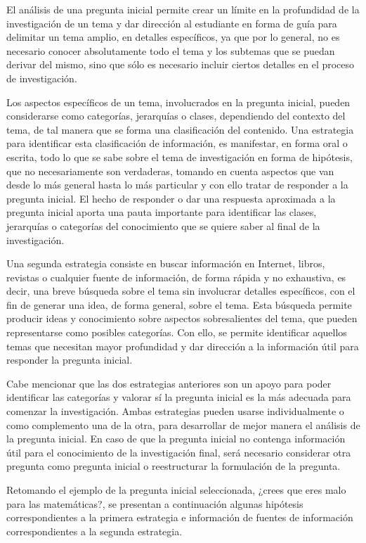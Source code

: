El análisis de una pregunta inicial permite crear un límite en la profundidad de la investigación de un tema y dar dirección al estudiante en forma de guía para delimitar un tema amplio, en detalles específicos, ya que por lo general, no es necesario conocer absolutamente todo el tema y los subtemas que se puedan derivar del mismo, sino que sólo es necesario incluir ciertos detalles en el proceso de investigación.

Los aspectos específicos de un tema, involucrados en la pregunta inicial, pueden considerarse como categorías, jerarquías o clases, dependiendo del contexto del tema, de tal manera que se forma una clasificación del contenido. Una estrategia para identificar esta clasificación de información, es manifestar, en forma oral o escrita, todo lo que se sabe sobre el tema de investigación en forma de hipótesis, que no necesariamente son verdaderas, tomando en cuenta aspectos que van desde lo más general hasta lo más particular y con ello tratar de responder a la pregunta inicial. El hecho de responder o dar una respuesta aproximada a la pregunta inicial aporta una pauta importante para identificar las clases, jerarquías o categorías del conocimiento que se quiere saber al final de la investigación.

Una segunda estrategia consiste en buscar información en Internet, libros, revistas o cualquier fuente de información, de forma rápida y no exhaustiva, es decir, una breve búsqueda sobre el tema sin involucrar detalles específicos, con el fin de generar una idea, de forma general, sobre el tema. Esta búsqueda permite producir ideas y conocimiento sobre aspectos sobresalientes del tema, que pueden representarse como posibles categorías. Con ello, se permite identificar aquellos temas que necesitan mayor profundidad y dar dirección a la información útil para responder la pregunta inicial.

Cabe mencionar que las dos estrategias anteriores son un apoyo para poder identificar las categorías y valorar sí la pregunta inicial es la más adecuada para comenzar la investigación. Ambas estrategias pueden usarse individualmente o como complemento una de la otra, para desarrollar de mejor manera el análisis de la pregunta inicial. En caso de que la pregunta inicial no contenga información útil para el conocimiento de la investigación final, será necesario considerar otra pregunta como pregunta inicial o reestructurar la formulación de la pregunta.

Retomando el ejemplo de la pregunta inicial seleccionada, ¿crees que eres malo para las matemáticas?, se presentan a continuación algunas hipótesis correspondientes a la primera estrategia e información de fuentes de información correspondientes a la segunda estrategia.

